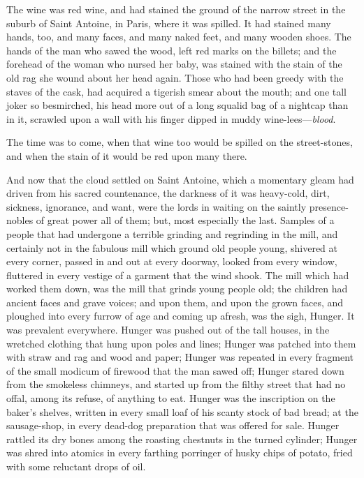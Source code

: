 The wine was red wine, and had stained the ground of the narrow
street in the suburb of Saint Antoine, in Paris, where it was
spilled.  It had stained many hands, too, and many faces, and many
naked feet, and many wooden shoes.  The hands of the man who sawed
the wood, left red marks on the billets; and the forehead of the
woman who nursed her baby, was stained with the stain of the old rag
she wound about her head again.  Those who had been greedy with the
staves of the cask, had acquired a tigerish smear about the mouth;
and one tall joker so besmirched, his head more out of a long squalid
bag of a nightcap than in it, scrawled upon a wall with his finger
dipped in muddy wine-lees---\emph{blood}.

The time was to come, when that wine too would be spilled on the
street-stones, and when the stain of it would be red upon many there.

And now that the cloud settled on Saint Antoine, which a momentary
gleam had driven from his sacred countenance, the darkness of it was
heavy-cold, dirt, sickness, ignorance, and want, were the lords in
waiting on the saintly presence-nobles of great power all of them;
but, most especially the last.  Samples of a people that had
undergone a terrible grinding and regrinding in the mill, and
certainly not in the fabulous mill which ground old people young,
shivered at every corner, passed in and out at every doorway, looked
from every window, fluttered in every vestige of a garment that the
wind shook.  The mill which had worked them down, was the mill that
grinds young people old; the children had ancient faces and grave
voices; and upon them, and upon the grown faces, and ploughed into
every furrow of age and coming up afresh, was the sigh, Hunger.  It
was prevalent everywhere.  Hunger was pushed out of the tall houses,
in the wretched clothing that hung upon poles and lines; Hunger was
patched into them with straw and rag and wood and paper; Hunger was
repeated in every fragment of the small modicum of firewood that the
man sawed off; Hunger stared down from the smokeless chimneys, and
started up from the filthy street that had no offal, among its refuse,
of anything to eat.  Hunger was the inscription on the baker's
shelves, written in every small loaf of his scanty stock of bad
bread; at the sausage-shop, in every dead-dog preparation that was
offered for sale.  Hunger rattled its dry bones among the roasting
chestnuts in the turned cylinder; Hunger was shred into atomics in
every farthing porringer of husky chips of potato, fried with some
reluctant drops of oil.

